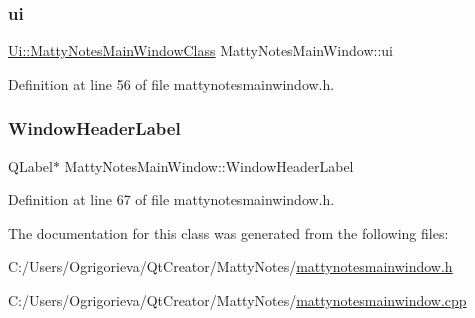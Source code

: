 \subsubsection{\texorpdfstring{ui}{ui}}
{\footnotesize\ttfamily \hyperlink{classUi_1_1MattyNotesMainWindowClass}{Ui\+::\+Matty\+Notes\+Main\+Window\+Class} Matty\+Notes\+Main\+Window\+::ui\hspace{0.3cm}{\ttfamily [private]}}



Definition at line 56 of file mattynotesmainwindow.\+h.

\hypertarget{classMattyNotesMainWindow_a615bd7bd2d770a4d0b97f09c71e32333}{}\label{classMattyNotesMainWindow_a615bd7bd2d770a4d0b97f09c71e32333} 
\subsubsection{\texorpdfstring{Window\+Header\+Label}{WindowHeaderLabel}}
{\footnotesize\ttfamily Q\+Label$\ast$ Matty\+Notes\+Main\+Window\+::\+Window\+Header\+Label\hspace{0.3cm}{\ttfamily [private]}}



Definition at line 67 of file mattynotesmainwindow.\+h.



The documentation for this class was generated from the following files\+:\begin{DoxyCompactItemize}
\item 
C\+:/\+Users/\+Ogrigorieva/\+Qt\+Creator/\+Matty\+Notes/\hyperlink{mattynotesmainwindow_8h}{mattynotesmainwindow.\+h}\item 
C\+:/\+Users/\+Ogrigorieva/\+Qt\+Creator/\+Matty\+Notes/\hyperlink{mattynotesmainwindow_8cpp}{mattynotesmainwindow.\+cpp}\end{DoxyCompactItemize}

